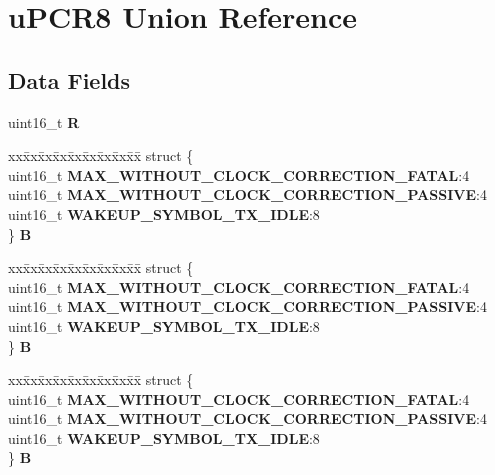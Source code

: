 \hypertarget{unionuPCR8}{}\section{u\+P\+C\+R8 Union Reference}
\label{unionuPCR8}
\subsection*{Data Fields}
\begin{DoxyCompactItemize}
\item 
\mbox{\label{unionuPCR8_aa80e32d5e71256c6c1943c861821e8a6}} 
uint16\+\_\+t {\bfseries R}
\item 
\mbox{\label{unionuPCR8_a3bb1df6925bbc701431f14a2e7807cbc}} 
\begin{tabbing}
xx\=xx\=xx\=xx\=xx\=xx\=xx\=xx\=xx\=\kill
struct \{\\
\>uint16\_t {\bfseries MAX\_WITHOUT\_CLOCK\_CORRECTION\_FATAL}:4\\
\>uint16\_t {\bfseries MAX\_WITHOUT\_CLOCK\_CORRECTION\_PASSIVE}:4\\
\>uint16\_t {\bfseries WAKEUP\_SYMBOL\_TX\_IDLE}:8\\
\} {\bfseries B}\\

\end{tabbing}\item 
\mbox{\label{unionuPCR8_a3b68230fb39deded2b9804e0cf183a0a}} 
\begin{tabbing}
xx\=xx\=xx\=xx\=xx\=xx\=xx\=xx\=xx\=\kill
struct \{\\
\>uint16\_t {\bfseries MAX\_WITHOUT\_CLOCK\_CORRECTION\_FATAL}:4\\
\>uint16\_t {\bfseries MAX\_WITHOUT\_CLOCK\_CORRECTION\_PASSIVE}:4\\
\>uint16\_t {\bfseries WAKEUP\_SYMBOL\_TX\_IDLE}:8\\
\} {\bfseries B}\\

\end{tabbing}\item 
\mbox{\label{unionuPCR8_a981a2db1c65ba680e1667da4178f54b3}} 
\begin{tabbing}
xx\=xx\=xx\=xx\=xx\=xx\=xx\=xx\=xx\=\kill
struct \{\\
\>uint16\_t {\bfseries MAX\_WITHOUT\_CLOCK\_CORRECTION\_FATAL}:4\\
\>uint16\_t {\bfseries MAX\_WITHOUT\_CLOCK\_CORRECTION\_PASSIVE}:4\\
\>uint16\_t {\bfseries WAKEUP\_SYMBOL\_TX\_IDLE}:8\\
\} {\bfseries B}\\


\end{tabbing}
\end{DoxyCompactItemize}
